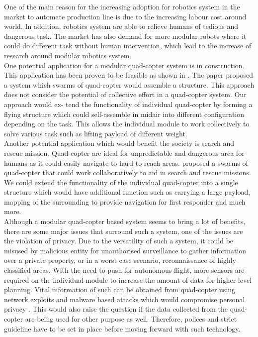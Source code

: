 \documentclass[12pt,A4]{article}
\begin{document}
	One of the main reason for the increasing adoption for robotics system in the market to automate production line is due to the increasing labour cost around world. In addition, robotics system are able to relieve humans of tedious and dangerous task. The market has also demand for more modular robots where it could do different task without human intervention, which lead to the increase of research around modular robotics system.\\
	
	One potential application for a modular quad-copter system is in construction. This application has been proven to be feasible as shown in \citep{augugliaro2014flight}. The paper proposed a system which swarms of
	quad-copter would assemble a structure. This approach does not consider the
	potential of collective effort in a quad-copter system. Our approach would ex-
	tend the functionality of individual quad-copter by forming a flying structure
	which could self-assemble in midair into different configuration depending on
	the task. This allows the individual module to work collectively to solve
	various task such as lifting payload of different weight.\\
	
	Another potential application which would benefit the society is search and rescue mission. Quad-copter are ideal for unpredictable and dangerous area for humans as it could easily navigate to hard to reach areas. \citep{stormont2005autonomous} proposed a swarms of quad-copter that could work collaboratively to aid in search and rescue missions. We could extend the functionality of the individual quad-copter into a single structure which would have additional function such as carrying a large payload, mapping of the surrounding to provide navigation for first responder and much more.\\
	
	Although a modular quad-copter based system seems to bring a lot of benefits, there are some major issues that surround such a system, one of the issues are the violation of privacy. Due to the versatility of such a system, it could be misused by malicious entity for unauthorised surveillance to gather information over a private property, or in a worst case scenario, reconnaissance of highly classified areas. With the need to push for autonomous flight, more sensors are required on the individual module to increase the amount of data for higher
	level planning. Vital information of such can be obtained from quad-copter
	using network exploits and malware based attacks which would compromise
	personal privacy \citep{vattapparamban2016drones}. This would also raise the
	question if the data collected from the quad-copter are being used for other
	purpose as well. Therefore, polices and strict guideline have to be set in place
	before moving forward with such technology.\\
	
\end{document}
